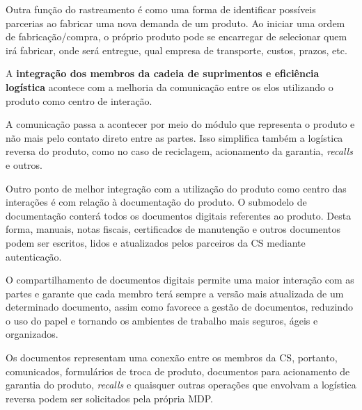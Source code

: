 	Outra função do rastreamento é como uma forma de identificar possíveis parcerias ao fabricar uma nova demanda de um produto. Ao iniciar uma ordem de fabricação/compra, o próprio produto pode se encarregar de selecionar quem irá fabricar, onde será entregue, qual empresa de transporte, custos, prazos, etc.
	
	A  \textbf{integração dos membros da cadeia de suprimentos e eficiência logística} acontece com a melhoria da comunicação entre os elos utilizando o produto como centro de interação.
	
	A comunicação passa a acontecer por meio do módulo que representa o produto e não mais pelo contato direto entre as partes. Isso simplifica também a logística reversa do produto, como no caso de reciclagem, acionamento da garantia, \textit{recalls} e outros.
	
	Outro ponto de melhor integração com a utilização do produto como centro das interações é com relação à documentação do produto. O submodelo de documentação conterá todos os documentos digitais referentes ao produto. Desta forma, manuais, notas fiscais, certificados de manutenção e outros documentos podem ser escritos, lidos e atualizados pelos parceiros da CS mediante autenticação.
	
	O compartilhamento de documentos digitais permite uma maior interação com as partes e garante que cada membro terá sempre a versão mais atualizada de um determinado documento, assim como favorece a gestão de documentos, reduzindo o uso do papel e tornando os ambientes de trabalho mais seguros, ágeis e organizados.
	
	Os documentos representam uma conexão entre os membros da CS, portanto, comunicados, formulários de troca de produto, documentos para acionamento de garantia do produto, \textit{recalls} e quaisquer outras operações que envolvam a logística reversa podem ser solicitados pela própria MDP.
